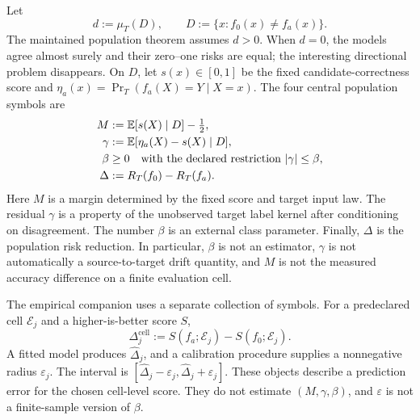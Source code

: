 Let
\begin{equation}
  d:=\mu_T(D),
  \qquad
  D:=\{x:f_0(x)\ne f_a(x)\}.
  \label{fr:eq-disagreement-mass}
\end{equation}
The maintained population theorem assumes $d>0$.  When $d=0$, the models agree almost surely and
their zero--one risks are equal; the interesting directional problem disappears.  On $D$, let
$s(x)\in[0,1]$ be the fixed candidate-correctness score and
$\eta_a(x)=\Pr_T(f_a(X)=Y\mid X=x)$.  The four central population symbols are
\begin{align}
  M
    &:=\mathbb{E}[s(X)\mid D]-\tfrac12, \\
  \gamma
    &:=\mathbb{E}[\eta_a(X)-s(X)\mid D], \\
  \beta
    &\ge 0 \quad\text{with the declared restriction }|\gamma|\le\beta, \\
  \Delta
    &:=R_T(f_0)-R_T(f_a).
  \label{fr:eq-population-symbol-chain}
\end{align}
Here $M$ is a margin determined by the fixed score and target input law.  The residual $\gamma$ is
a property of the unobserved target label kernel after conditioning on disagreement.  The number
$\beta$ is an external class parameter.  Finally, $\Delta$ is the population risk reduction.  In
particular, $\beta$ is not an estimator, $\gamma$ is not automatically a source-to-target drift
quantity, and $M$ is not the measured accuracy difference on a finite evaluation cell.

The empirical companion uses a separate collection of symbols.  For a predeclared cell
$\mathcal E_j$ and a higher-is-better score $S$,
\begin{equation}
  \Delta_j^{\mathrm{cell}}
  :=S(f_a;\mathcal E_j)-S(f_0;\mathcal E_j).
  \label{fr:eq-cell-benefit}
\end{equation}
A fitted model produces $\widehat\Delta_j$, and a calibration procedure supplies a nonnegative
radius $\varepsilon_j$.  The interval is
$[\widehat\Delta_j-\varepsilon_j,\widehat\Delta_j+\varepsilon_j]$.  These objects describe a
prediction error for the chosen cell-level score.  They do not estimate $(M,\gamma,\beta)$, and
$\varepsilon$ is not a finite-sample version of $\beta$.

